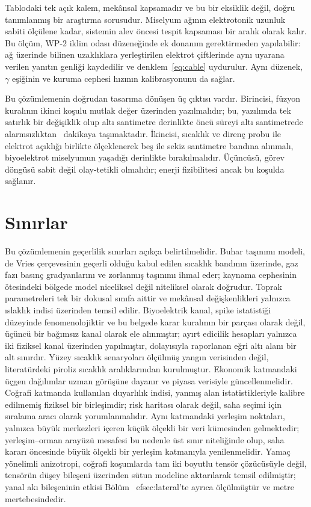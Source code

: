 \documentclass[11pt,a4paper]{article}
\begin{document}
Tablodaki tek açık kalem, mekânsal kapsamadır ve bu bir eksiklik değil, doğru
tanımlanmış bir araştırma sorusudur. Miselyum ağının elektrotonik uzunluk
sabiti ölçülene kadar, sistemin alev öncesi tespit kapsaması bir aralık olarak
kalır. Bu ölçüm, WP-2 iklim odası düzeneğinde ek donanım gerektirmeden
yapılabilir: ağ üzerinde bilinen uzaklıklara yerleştirilen elektrot çiftlerinde
aynı uyarana verilen yanıtın genliği kaydedilir ve denklem~\eqref{eq:cable}
uydurulur. Aynı düzenek, $\gamma$ eşiğinin ve kuruma cephesi hızının
kalibrasyonunu da sağlar.

Bu çözümlemenin doğrudan tasarıma dönüşen üç çıktısı vardır. Birincisi, füzyon
kuralının ikinci koşulu mutlak değer üzerinden yazılmalıdır; bu, yazılımda tek
satırlık bir değişiklik olup altı santimetre derinlikte öncü süreyi
altı santimetrede alarmsızlıktan \leadNom\ dakikaya taşımaktadır. İkincisi, sıcaklık ve direnç probu ile elektrot açıklığı
birlikte ölçeklenerek beş ile sekiz santimetre bandına alınmalı, biyoelektrot
miselyumun yaşadığı derinlikte bırakılmalıdır. Üçüncüsü, görev döngüsü sabit
değil olay-tetikli olmalıdır; enerji fizibilitesi ancak bu koşulda sağlanır.

\section{Sınırlar}

Bu çözümlemenin geçerlilik sınırları açıkça belirtilmelidir. Buhar taşınımı
modeli, de Vries çerçevesinin geçerli olduğu kabul edilen sıcaklık bandının
üzerinde, gaz fazı basınç gradyanlarını ve zorlanmış taşınımı ihmal eder;
kaynama cephesinin ötesindeki bölgede model niceliksel değil niteliksel
olarak doğrudur. Toprak parametreleri tek bir dokusal sınıfa aittir ve
mekânsal değişkenlikleri yalnızca ıslaklık indisi üzerinden temsil edilir.
Biyoelektrik kanal, spike istatistiği düzeyinde fenomenolojiktir ve bu
belgede karar kuralının bir parçası olarak değil, üçüncü bir bağımsız kanal
olarak ele alınmıştır; ayırt edicilik hesapları yalnızca iki fiziksel kanal
üzerinden yapılmıştır, dolayısıyla raporlanan eğri altı alanı bir alt sınırdır.
Yüzey sıcaklık senaryoları ölçülmüş yangın verisinden değil, literatürdeki
piroliz sıcaklık aralıklarından kurulmuştur. Ekonomik katmandaki üçgen
dağılımlar uzman görüşüne dayanır ve piyasa verisiyle güncellenmelidir.
Coğrafi katmanda kullanılan duyarlılık indisi, yanmış alan istatistikleriyle
kalibre edilmemiş fiziksel bir birleşimdir; risk haritası olarak değil, saha
seçimi için sıralama aracı olarak yorumlanmalıdır. Aynı katmandaki yerleşim
noktaları, yalnızca büyük merkezleri içeren küçük ölçekli bir veri kümesinden
gelmektedir; yerleşim--orman arayüzü mesafesi bu nedenle üst sınır niteliğinde
olup, saha kararı öncesinde büyük ölçekli bir yerleşim katmanıyla
yenilenmelidir. Yamaç yönelimli anizotropi, coğrafi koşumlarda tam iki boyutlu
tensör çözücüsüyle değil, tensörün düşey bileşeni üzerinden sütun modeline
aktarılarak temsil edilmiştir; yanal akı bileşeninin etkisi
Bölüm~
ef{sec:lateral}'te ayrıca ölçülmüştür ve metre mertebesindedir.
\end{document}
